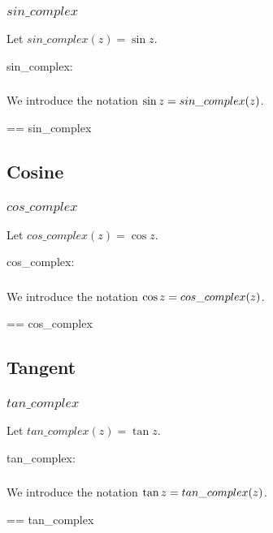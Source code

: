 \documentclass[11pt, oneside]{article}
\begin{document}
\subsubsection{$sin\_complex$}

Let $sin\_complex(z) = \sin z$.

\begin{axdef}
	sin\_complex: \C \fun \C
\end{axdef}

\subsubsection{}

We introduce the notation $\operatorname{sin} z = sin\_complex(z)$.

\begin{zed}
	\sinC == sin\_complex
\end{zed}

\subsection{Cosine}

\subsubsection{$cos\_complex$}

Let $cos\_complex(z) = \cos z$.

\begin{axdef}
	cos\_complex: \C \fun \C
\end{axdef}

\subsubsection{}

We introduce the notation $\operatorname{cos} z = cos\_complex(z)$.

\begin{zed}
	\cosC == cos\_complex
\end{zed}

\subsection{Tangent}

\subsubsection{$tan\_complex$}

Let $tan\_complex(z) = \tan z$.

\begin{axdef}
	tan\_complex: \C \pfun \C
\end{axdef}

\subsubsection{}

We introduce the notation $\operatorname{tan} z = tan\_complex(z)$.

\begin{zed}
	\tanC == tan\_complex
\end{zed}

\printbibliography
\end{document}
